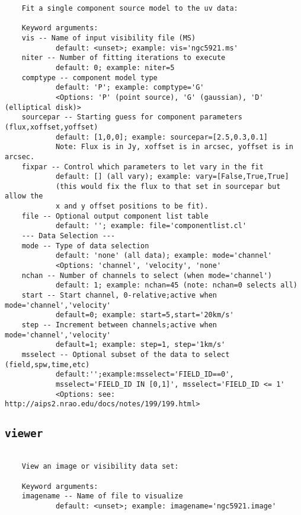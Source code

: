 \small
\begin{verbatim}
    Fit a single component source model to the uv data:
    
    Keyword arguments:
    vis -- Name of input visibility file (MS)
            default: <unset>; example: vis='ngc5921.ms'
    niter -- Number of fitting iterations to execute
            default: 0; example: niter=5
    comptype -- component model type
            default: 'P'; example: comptype='G'
            <Options: 'P' (point source), 'G' (gaussian), 'D' (elliptical disk)>
    sourcepar -- Starting guess for component parameters (flux,xoffset,yoffset)
            default: [1,0,0]; example: sourcepar=[2.5,0.3,0.1]
            Note: Flux is in Jy, xoffset is in arcsec, yoffset is in arcsec.
    fixpar -- Control which parameters to let vary in the fit
            default: [] (all vary); example: vary=[False,True,True]
            (this would fix the flux to that set in sourcepar but allow the
            x and y offset positions to be fit).
    file -- Optional output component list table
            default: ''; example: file='componentlist.cl'
    --- Data Selection ---
    mode -- Type of data selection
            default: 'none' (all data); example: mode='channel'
            <Options: 'channel', 'velocity', 'none'
    nchan -- Number of channels to select (when mode='channel')
            default: 1; example: nchan=45 (note: nchan=0 selects all)
    start -- Start channel, 0-relative;active when mode='channel','velocity'
            default=0; example: start=5,start='20km/s'
    step -- Increment between channels;active when mode='channel','velocity'
            default=1; example: step=1, step='1km/s'
    msselect -- Optional subset of the data to select (field,spw,time,etc)
            default:'';example:msselect='FIELD_ID==0', 
            msselect='FIELD_ID IN [0,1]', msselect='FIELD_ID <= 1'
            <Options: see: http://aips2.nrao.edu/docs/notes/199/199.html>
\end{verbatim}
\normalsize


\subsection{{\tt viewer}}
\label{section:tasks.viewer}

\small
\begin{verbatim}

    View an image or visibility data set:
    
    Keyword arguments:
    imagename -- Name of file to visualize
            default: <unset>; example: imagename='ngc5921.image'
\end{verbatim}
\normalsize

